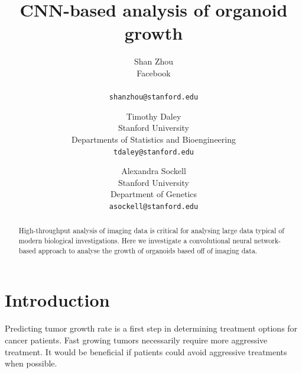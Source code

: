 \documentclass[10pt,twocolumn,letterpaper]{article}
\begin{document}
\title{CNN-based analysis of organoid growth}

\author{Shan Zhou \\
Facebook \\
\\
{\tt\small shanzhou@stanford.edu}
\and
Timothy Daley \\
Stanford University \\
Departments of Statistics and Bioengineering \\
{\tt\small tdaley@stanford.edu}
\and
Alexandra Sockell \\
Stanford University \\
Department of Genetics \\
{\tt\small asockell@stanford.edu}
}


\maketitle

\begin{abstract}
   High-throughput analysis of imaging data is critical for analysing large data typical of modern biological investigations.  Here we investigate a convolutional neural network-based approach to analyse the growth of organoids based off of imaging data.  
\end{abstract}

\section{Introduction}

Predicting tumor growth rate is a first step in determining treatment options for cancer patients.  Fast growing tumors necessarily require more aggressive treatment.  It would be beneficial if patients could avoid aggressive treatments when possible.  
\end{document}
